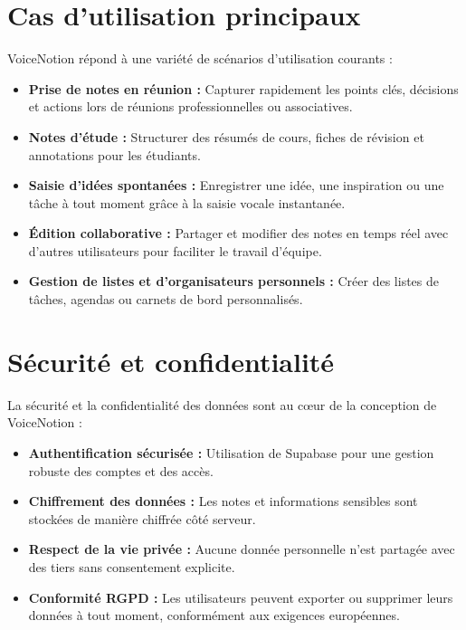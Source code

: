 \section{Cas d’utilisation principaux}
VoiceNotion répond à une variété de scénarios d’utilisation courants :
\begin{itemize}
    \item \textbf{Prise de notes en réunion :} Capturer rapidement les points clés, décisions et actions lors de réunions professionnelles ou associatives.
    \item \textbf{Notes d’étude :} Structurer des résumés de cours, fiches de révision et annotations pour les étudiants.
    \item \textbf{Saisie d’idées spontanées :} Enregistrer une idée, une inspiration ou une tâche à tout moment grâce à la saisie vocale instantanée.
    \item \textbf{Édition collaborative :} Partager et modifier des notes en temps réel avec d’autres utilisateurs pour faciliter le travail d’équipe.
    \item \textbf{Gestion de listes et d’organisateurs personnels :} Créer des listes de tâches, agendas ou carnets de bord personnalisés.
\end{itemize}

\section{Sécurité et confidentialité}
La sécurité et la confidentialité des données sont au cœur de la conception de VoiceNotion :
\begin{itemize}
    \item \textbf{Authentification sécurisée :} Utilisation de Supabase pour une gestion robuste des comptes et des accès.
    \item \textbf{Chiffrement des données :} Les notes et informations sensibles sont stockées de manière chiffrée côté serveur.
    \item \textbf{Respect de la vie privée :} Aucune donnée personnelle n’est partagée avec des tiers sans consentement explicite.
    \item \textbf{Conformité RGPD :} Les utilisateurs peuvent exporter ou supprimer leurs données à tout moment, conformément aux exigences européennes.
\end{itemize}

